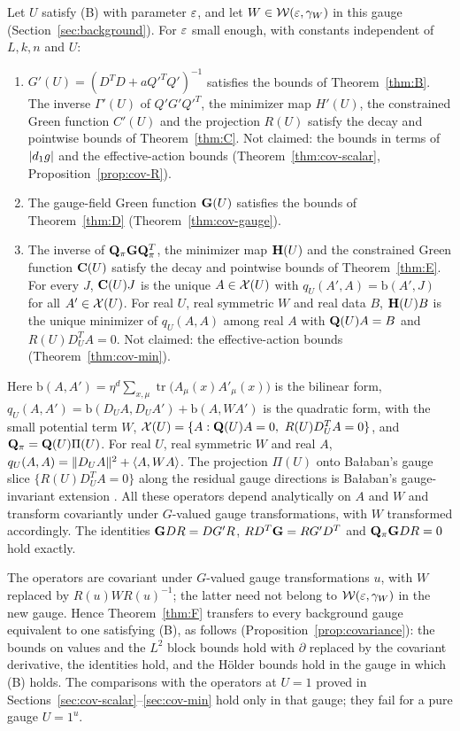 \begin{maintheorem}\label{thm:F}
Let $U$ satisfy (B) with parameter $\varepsilon$, and let $W\in\mathcal W(\varepsilon,\gamma_W)$ in this gauge (Section~\ref{sec:background}). For $\varepsilon$ small enough, with constants independent of $L,k,n$ and $U$:
\begin{enumerate}[label=(\roman*)]
\item $G'(U)=(D^TD+aQ'^TQ')^{-1}$ satisfies the bounds of Theorem~\ref{thm:B}. The inverse $\Gamma'(U)$ of $Q'G'Q'^T$, the minimizer map $H'(U)$, the constrained Green function $C'(U)$ and the projection $R(U)$ satisfy the decay and pointwise bounds of Theorem~\ref{thm:C}. Not claimed: the bounds in terms of $|d_1 g|$ and the effective-action bounds (Theorem~\ref{thm:cov-scalar}, Proposition~\ref{prop:cov-R}).
\item The gauge-field Green function $\mathbf G(U)$ satisfies the bounds of Theorem~\ref{thm:D} (Theorem~\ref{thm:cov-gauge}).
\item The inverse of $\mathbf Q_\pi\mathbf G\mathbf Q_\pi^T$, the minimizer map $\mathbf H(U)$ and the constrained Green function $\mathbf C(U)$ satisfy the decay and pointwise bounds of Theorem~\ref{thm:E}. For every $J$, $\mathbf C(U)J$ is the unique $A\in\mathcal X(U)$ with $q_U(A',A)=\mathrm b(A',J)$ for all $A'\in\mathcal X(U)$. For real $U$, real symmetric $W$ and real data $B$, $\mathbf H(U)B$ is the unique minimizer of $q_U(A,A)$ among real $A$ with $\mathbf Q(U)A=B$ and $R(U)D_U^TA=0$. Not claimed: the effective-action bounds (Theorem~\ref{thm:cov-min}).
\end{enumerate}
Here $\mathrm b(A,A')=\eta^d\sum_{x,\mu}\operatorname{tr}\big(A_\mu(x)A'_\mu(x)\big)$ is the bilinear form, $q_U(A,A')=\mathrm b(D_UA,D_UA')+\mathrm b(A,WA')$ is the quadratic form, with the small potential term $W$, $\cX(U)=\{A:\bQ(U)A=0,\ R(U)D_U^TA=0\}$, and $\mathbf Q_\pi=\mathbf Q(U)\Pi(U)$. For real $U$, real symmetric $W$ and real $A$, $q_U(A,A)=\|D_UA\|^2+\langle A,WA\rangle$. The projection $\Pi(U)$ onto Ba\l aban's gauge slice $\{R(U)D_U^TA=0\}$ along the residual gauge directions is Ba\l aban's gauge-invariant extension \cite[(3.118)--(3.119)]{BalBackground}. All these operators depend analytically on $A$ and $W$ and transform covariantly under $G$-valued gauge transformations, with $W$ transformed accordingly. The identities $\mathbf G DR=DG'R$, $RD^T\mathbf G=RG'D^T$ and $\mathbf Q_\pi\mathbf G DR=0$ hold exactly.
\end{maintheorem}

The operators are covariant under $G$-valued gauge transformations $u$, with $W$ replaced by $R(u)WR(u)^{-1}$; the latter need not belong to $\mathcal W(\varepsilon,\gamma_W)$ in the new gauge. Hence Theorem~\ref{thm:F} transfers to every background gauge equivalent to one satisfying (B), as follows (Proposition~\ref{prop:covariance}): the bounds on values and the $L^2$ block bounds hold with $\partial$ replaced by the covariant derivative, the identities hold, and the H\"older bounds hold in the gauge in which (B) holds. The comparisons with the operators at $U=1$ proved in Sections~\ref{sec:cov-scalar}--\ref{sec:cov-min} hold only in that gauge; they fail for a pure gauge $U=1^u$.

